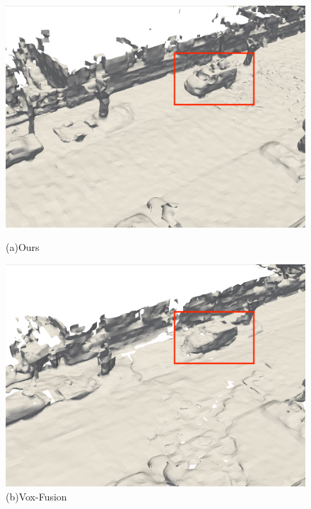 \begin{figure}[htbp]
\begin{minipage}{0.5\linewidth}
		\includegraphics[width=1\linewidth]{figures/kitti_3_vox.png}
        \caption*{(a)Ours}
	\end{minipage}\hfill
    \begin{minipage}{0.5\linewidth}
		\centering
		\includegraphics[width=1\linewidth]{figures/kitti_3_bce.png}
        \caption*{(b)Vox-Fusion}
	\end{minipage}
\end{figure}
